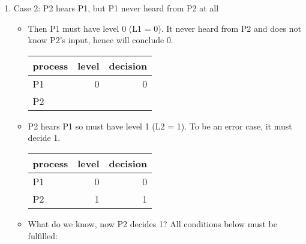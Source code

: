 \documentclass[11pt]{article}
\begin{document}
\begin{enumerate}
\begin{enumerate}
\begin{enumerate}
\begin{enumerate}
\begin{enumerate}
\begin{enumerate}
                                                \label{sec:orgd30a0df}
                                        \end{enumerate}
                                  \item Case 2: P2 hears P1, but P1 never heard from P2 at all
                                        \label{sec:org2a37117}
                                        \begin{itemize}
                                          \item Then P1 must have level 0 (L1 = 0). It never heard from P2 and does not know
                                                P2's input, hence will conclude 0.
                                                \begin{center}
                                                  \begin{tabular}{lrr}
                                                    process & level & decision\\
                                                    \hline
                                                    P1 & 0 & 0\\
                                                    P2 &  & \\
                                                  \end{tabular}
                                                \end{center}
                                          \item P2 hears P1 so must have level 1 (L2 = 1). To be an error case, it must
                                                decide 1.
                                                \begin{center}
                                                  \begin{tabular}{lrr}
                                                    process & level & decision\\
                                                    \hline
                                                    P1 & 0 & 0\\
                                                    P2 & 1 & 1\\
                                                  \end{tabular}
                                                \end{center}
                                          \item What do we know, now P2 decides 1? All conditions below must be fulfilled:

\end{itemize}
\end{enumerate}
\end{enumerate}
\end{enumerate}
\end{enumerate}
\end{enumerate}
\end{document}
